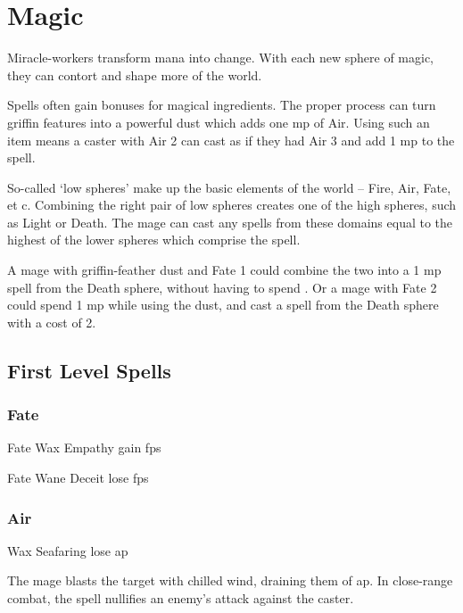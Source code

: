 \chapter[Chamber of Magic]{Magic}

\begin{multicols}{2}



\noindent
Miracle-workers transform mana into change.
With each new sphere of magic, they can contort and shape more of the world.

Spells often gain bonuses for magical ingredients.
The proper process can turn griffin features into a powerful dust which adds one \gls{mp} of Air.
Using such an item means a caster with Air 2 can cast as if they had Air 3 and add 1 \gls{mp} to the spell.

So-called `low spheres' make up the basic elements of the world -- Fire, Air, Fate, et c.
Combining the right pair of low spheres creates one of the high spheres, such as Light or Death.
The mage can cast any spells from these domains equal to the highest of the lower spheres which comprise the spell.

A mage with griffin-feather dust and Fate 1 could combine the two into a 1 \gls{mp} spell from the Death sphere, without having to spend .
Or a mage with Fate 2 could spend 1 \gls{mp} while using the dust, and cast a spell from the Death sphere with a cost of 2.

\end{multicols}

\section{First Level Spells}

\begin{multicols}{2}

\subsection{Fate}

  {Fate}%
  {Wax}%
  {}%
  {Empathy}%
  {gain  \glspl{fp}}%

  {Fate}%
  {Wane}%
  {}%
  {Deceit}%
  {lose  \glspl{fp}}%

\subsection{Air}

  {\mAir}%
  {Wax}%
  {}%
  {Seafaring}%
  {lose  \gls{ap}}%

The mage blasts the target with chilled wind, draining them of  \gls{ap}.
In close-range combat, the spell nullifies an enemy's attack against the caster.

\end{multicols}

